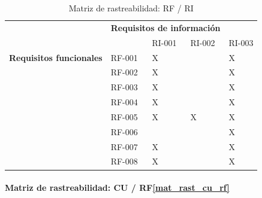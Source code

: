 \begin{table}[htpb]
\centering
\begin{tabular}{|l|l|l|l|l|}
\hline
\rowcolor[gray]{0.9}\multicolumn{2}{|l|}{\multirow{2}{*}{}} & \multicolumn{3}{l|}{\textbf{Requisitos de información}} \\ \cline{3-5} 
\multicolumn{2}{|l|}{}                  & RI-001         & RI-002        & RI-003        \\ \hline
\textbf{Requisitos funcionales}     & RF-001     & X              &               & X             \\ \hline
\multirow{7}{*}{}          & RF-002     & X              &               & X             \\ \cline{2-5} 
                           & RF-003     & X              &               & X             \\ \cline{2-5} 
                           & RF-004     & X              &               & X             \\ \cline{2-5} 
                           & RF-005     & X              & X             & X             \\ \cline{2-5} 
                           & RF-006     &                &               & X             \\ \cline{2-5} 
                           & RF-007     & X              &               & X             \\ \cline{2-5} 
                           & RF-008     & X              &               & X             \\ \hline
\end{tabular}
\caption{Matriz de rastreabilidad: RF / RI}
\label{mat_rast_rf_ri}
\end{table}


\paragraph{Matriz de rastreabilidad: CU / RF\ref{mat_rast_cu_rf}}


